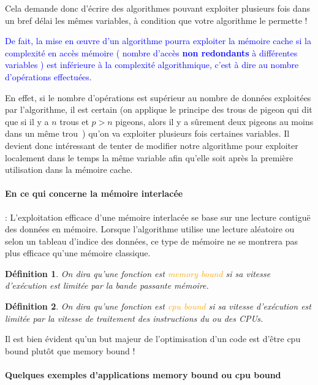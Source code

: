 \documentclass[fleqn,11pt]{article}
\newtheorem{definition}{Définition }
\begin{document}
Cela demande donc d'écrire des algorithmes pouvant exploiter plusieurs fois dans un bref délai les mêmes variables, à condition que votre algorithme le permette !

\textcolor{blue}{De fait, la mise en {\oe}uvre d'un algorithme pourra exploiter la mémoire cache si la complexité en accès mémoire ( nombre d'accès \textbf{non redondants} à différentes variables ) 
est inférieure à la complexité algorithmique, c'est à dire au nombre d'opérations effectuées.}

En effet, si le nombre d'opérations est supérieur au nombre de données exploitées par l'algorithme,
il est certain (on applique le principe des trous de pigeon qui dit que si il y a $n$ trous
et $p>n$ pigeons, alors il y a sûrement deux pigeons au moins dans un même trou~) qu'on va exploiter plusieurs
fois certaines variables. Il devient donc intéressant de tenter de modifier notre algorithme pour exploiter
localement dans le temps la même variable afin qu'elle soit après la première utilisation dans la
mémoire cache.

\paragraph{En ce qui concerne la mémoire interlacée} : L'exploitation efficace d'une mémoire interlacée se base sur une lecture contiguë des données en mémoire. Lorsque l'algorithme utilise une lecture aléatoire ou selon un tableau d'indice des données, ce type de mémoire ne se montrera pas plus efficace qu'une mémoire classique.


\begin{definition}
On dira qu'une fonction est \textcolor{orange}{memory bound} si sa vitesse d'exécution est limitée par la bande passante mémoire.
\end{definition}

\begin{definition}
On dira qu'une fonction est \textcolor{orange}{cpu bound} si sa vitesse d'exécution est limitée par la vitesse de traitement des instructions du ou des CPUs.
\end{definition}

Il est bien évident qu'un but majeur de l'optimisation d'un code est d'être cpu bound plutôt que memory bound !

\paragraph{Quelques exemples d'applications memory bound ou cpu bound}
{~} %
\end{document}
